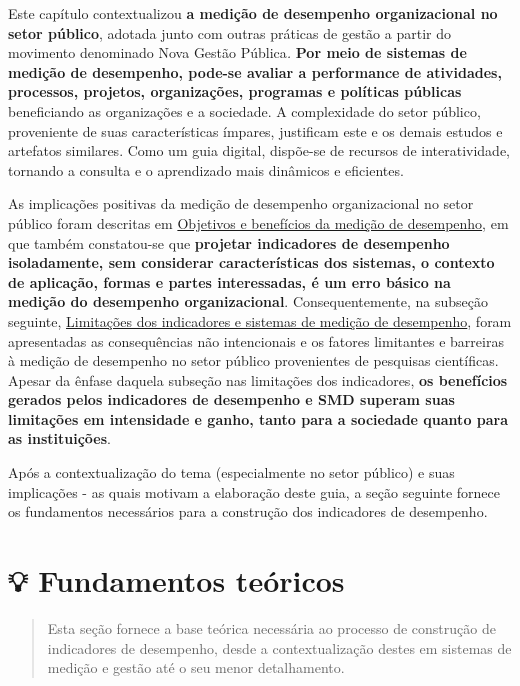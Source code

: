 \documentclass[
  letterpaper,
  DIV=11,
  numbers=noendperiod]{scrreprt}
\begin{document}

Este capítulo contextualizou \textbf{a medição de desempenho
organizacional no setor público}, adotada junto com outras práticas de
gestão a partir do movimento denominado Nova Gestão Pública\emph{.}
\textbf{Por meio de sistemas de medição de desempenho, pode-se avaliar a
performance de atividades, processos, projetos, organizações, programas
e políticas públicas} beneficiando as organizações e a sociedade. A
complexidade do setor público, proveniente de suas características
ímpares, justificam este e os demais estudos e artefatos similares. Como
um guia digital, dispõe-se de recursos de interatividade, tornando a
consulta e o aprendizado mais dinâmicos e eficientes.

As implicações positivas da medição de desempenho organizacional no
setor público foram descritas em
\protect\hyperlink{objetivos-e-benefuxedcios-da-mediuxe7uxe3o-de-desempenho}{Objetivos
e benefícios da medição de desempenho}, em que também constatou-se que
\textbf{projetar indicadores de desempenho isoladamente, sem considerar
características dos sistemas, o contexto de aplicação, formas e partes
interessadas, é um erro básico na medição do desempenho organizacional}.
Consequentemente, na subseção seguinte,
\protect\hyperlink{consequuxeancias-indesejadas-e-limitauxe7uxf5es-da-mediuxe7uxe3o-de-desempenho}{Limitações
dos indicadores e sistemas de medição de desempenho}, foram apresentadas
as consequências não intencionais e os fatores limitantes e barreiras à
medição de desempenho no setor público provenientes de pesquisas
científicas. Apesar da ênfase daquela subseção nas limitações dos
indicadores, \textbf{os benefícios gerados pelos indicadores de
desempenho e SMD superam suas limitações em intensidade e ganho, tanto
para a sociedade quanto para as instituições}.

Após a contextualização do tema (especialmente no setor público) e suas
implicações - as quais motivam a elaboração deste guia, a seção seguinte
fornece os fundamentos necessários para a construção dos indicadores de
desempenho.

\part{💡 Fundamentos teóricos}

\begin{quote}
Esta seção fornece a base teórica necessária ao processo de construção
de indicadores de desempenho, desde a contextualização destes em
sistemas de medição e gestão até o seu menor detalhamento.
\end{quote}
\end{document}
